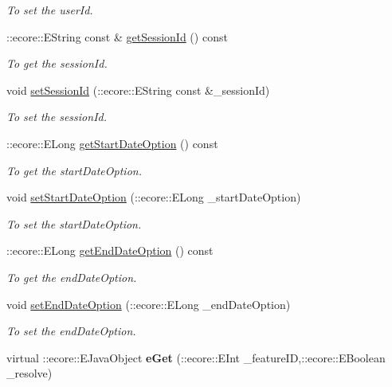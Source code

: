 \begin{DoxyCompactItemize}
\begin{DoxyCompactList}\small\item\em To set the userId. \item\end{DoxyCompactList}\item 
::ecore::EString const \& \hyperlink{classUMS__Data_1_1ListSessionOptions_a8fe7670d2b8fad69aa91d0c95b5d2c6a}{getSessionId} () const 
\begin{DoxyCompactList}\small\item\em To get the sessionId. \item\end{DoxyCompactList}\item 
void \hyperlink{classUMS__Data_1_1ListSessionOptions_a97d39d615864c4ee928571b9def10d39}{setSessionId} (::ecore::EString const \&\_\-sessionId)
\begin{DoxyCompactList}\small\item\em To set the sessionId. \item\end{DoxyCompactList}\item 
::ecore::ELong \hyperlink{classUMS__Data_1_1ListSessionOptions_aff638de6892ac32de8eedff818abf029}{getStartDateOption} () const 
\begin{DoxyCompactList}\small\item\em To get the startDateOption. \item\end{DoxyCompactList}\item 
void \hyperlink{classUMS__Data_1_1ListSessionOptions_aea186ab395f8e412a4240355a3fcb1fc}{setStartDateOption} (::ecore::ELong \_\-startDateOption)
\begin{DoxyCompactList}\small\item\em To set the startDateOption. \item\end{DoxyCompactList}\item 
::ecore::ELong \hyperlink{classUMS__Data_1_1ListSessionOptions_a2f9165ae9e9b49da4ddbbbbf1e48f367}{getEndDateOption} () const 
\begin{DoxyCompactList}\small\item\em To get the endDateOption. \item\end{DoxyCompactList}\item 
void \hyperlink{classUMS__Data_1_1ListSessionOptions_a55586402339dce7a106e99a736416dce}{setEndDateOption} (::ecore::ELong \_\-endDateOption)
\begin{DoxyCompactList}\small\item\em To set the endDateOption. \item\end{DoxyCompactList}\item 
\hypertarget{classUMS__Data_1_1ListSessionOptions_a445628f2a334956e80c8a380c6c8d90e}{
virtual ::ecore::EJavaObject {\bfseries eGet} (::ecore::EInt \_\-featureID,::ecore::EBoolean \_\-resolve)}
\label{classUMS__Data_1_1ListSessionOptions_a445628f2a334956e80c8a380c6c8d90e}


\end{DoxyCompactItemize}
